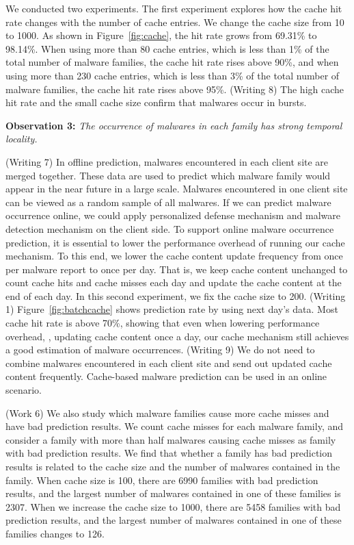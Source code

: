 We conducted two experiments. 
The first experiment explores how the cache hit rate changes with the number of cache entries. 
We change the cache size from 10 to 1000. 
As shown in Figure~\ref{fig:cache}, the hit rate grows from 69.31\% to 98.14\%. 
When using more than 80 cache entries, which is less than 1\% of the total number of malware families, the cache hit rate rises above 90\%, 
and when using more than 230 cache entries, which is less than 3\% of the total number of malware families, 
the cache hit rate rises above 95\%. 
{\color{red} (Writing 8)
The high cache hit rate and the small cache size confirm that malwares occur in bursts.
}

{\bf Observation 3:} 
{\em The occurrence of malwares in each family has strong temporal locality.}  

{\color{red} (Writing 7)
In offline prediction, malwares encountered in each client site are merged together. 
These data are used to predict which malware family would appear in the near future in a large scale.
Malwares encountered in one client site can be viewed as a random sample of all malwares. 
If we can predict malware occurrence online, we could apply personalized defense mechanism and malware detection mechanism on the client side. 
}
To support online malware occurrence prediction, it is essential to lower the 
performance overhead of running our cache mechanism.
To this end, we lower the cache content update frequency from once per malware report to once per day.
That is, we keep cache content unchanged to count cache hits and cache misses each day and update the cache content at the end of each day.
In this second experiment, we fix the cache size to 200. 
{\color{red} (Writing 1)
Figure~\ref{fig:batchcache} shows prediction rate by using next day’s data. 
Most cache hit rate is above 70\%,
showing that even when lowering performance overhead, \ie, updating cache content once a day, 
our cache mechanism still achieves a good estimation of malware occurrences.
}   
{\color{red} (Writing 9)
We do not need to combine malwares encountered in each client site and send out updated cache content frequently. Cache-based malware prediction can be used in an online scenario. 
}

{\color{red} (Work 6)
We also study which malware families cause more cache misses 
and have bad prediction results. 
We count cache misses for each malware family, 
and consider a family with more than half malwares causing cache misses as family with bad prediction results. 
We find that whether a family has bad prediction results is related to the cache size and the number of malwares contained in the family. 
When cache size is 100, there are 6990 families with bad prediction results, 
and the largest number of malwares contained in one of these families is 2307. 
When we increase the cache size to 1000, 
there are 5458 families with bad prediction results, 
and the largest number of malwares contained in one of these families changes to 126. 
}


